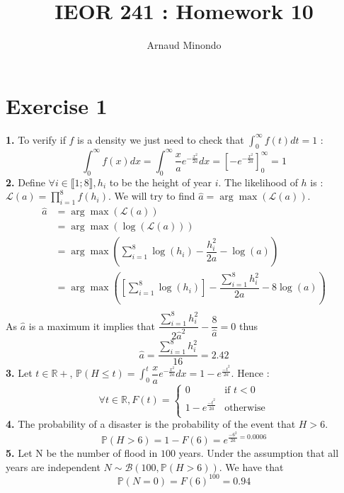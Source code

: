 \documentclass{article}
\title{IEOR 241 : Homework 10}
\author{Arnaud Minondo}
\begin{document}
\maketitle
\section*{Exercise 1}
\textbf{1.} To verify if $f$ is a density we just need to check that $\int_0^\infty f(t)dt = 1$ : $$\boxed{\int_0^\infty f(x)dx = \int_0^\infty \dfrac{x}{a}e^{-\frac{x^2}{2a}}dx  = \left[-e^{-\frac{x^2}{2a}}\right]_0^\infty = 1}$$
\textbf{2.} Define $\forall i\in\llbracket 1;8\rrbracket, h_i$ to be the height of year $i$. The likelihood of $h$ is : $\mathcal{L}(a) = \prod\limits_{i=1}^8 f(h_i)$. We will try to find $\hat{a }= \arg\max(\mathcal{L}(a))$.
\begin{align*}
    \hat{a }&= \arg\max(\mathcal{L}(a))\\
    &=\arg\max(\log(\mathcal{L}(a)))\\
    &=\arg\max(\sum\limits_{i=1}^8\log(h_i)-\dfrac{h_i^2}{2a}-\log(a))\\
    &=\arg\max\left(\left[\sum\limits_{i=1}^8\log(h_i)\right]-\dfrac{\sum\limits_{i=1}^8h_i^2}{2a}-8\log(a)\right)\\
\end{align*}
As $\hat{a}$ is a maximum it implies that $\dfrac{\sum\limits_{i=1}^8h_i^2}{2\hat{a}^2}-\dfrac{8}{\hat{a}} = 0$ thus $$\boxed{\hat{a} = \dfrac{\sum\limits_{i=1}^8h_i^2}{16} = 2.42}$$
\textbf{3.} Let $t\in\mathbb{R}+$, $\mathbb{P}(H\leq t) = \displaystyle\int_0^t\dfrac{x}{a}e^{-\frac{x^2}{2a}}dx = 1-e^{\frac{-t^2}{2a}}$. 
Hence : $$\boxed{\forall t\in\mathbb{R}, F(t) = \left\{\begin{array}{cl}
    0 &\text{if }t<0\\
    1-e^{\frac{-t^2}{2\hat{a}}} & \text{otherwise}\\
\end{array}\right.}$$
\textbf{4.} The probability of a disaster is the probability of the event that $H>6$. $$\boxed{\mathbb{P}(H>6) = 1-F(6) = e^{\frac{-6^2}{2\hat{a}} = 0.0006}}$$
\textbf{5.} Let N be the number of flood in $100$ years. Under the assumption that all years are independent $N\sim\mathcal{B}(100,\mathbb{P}(H>6))$. We have that $$\boxed{\mathbb{P}(N=0) = F(6)^{100} = 0.94}$$
\end{document}

